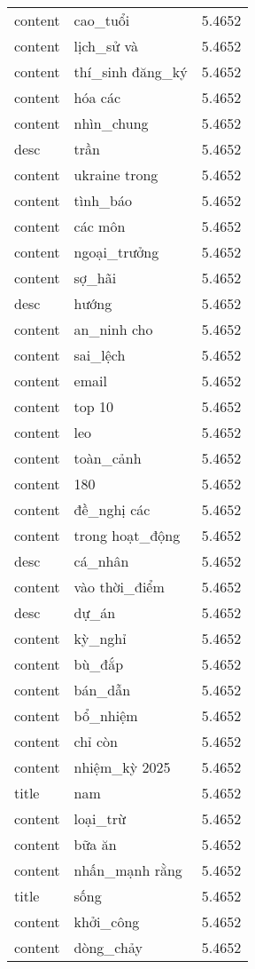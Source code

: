 \documentclass{article}
\begin{document}
\begin{tabular}{lll}
content & cao\_tuổi & 5.4652\\
content & lịch\_sử và & 5.4652\\
content & thí\_sinh đăng\_ký & 5.4652\\
content & hóa các & 5.4652\\
content & nhìn\_chung & 5.4652\\
desc & trần & 5.4652\\
content & ukraine trong & 5.4652\\
content & tình\_báo & 5.4652\\
content & các môn & 5.4652\\
content & ngoại\_trưởng & 5.4652\\
content & sợ\_hãi & 5.4652\\
desc & hướng & 5.4652\\
content & an\_ninh cho & 5.4652\\
content & sai\_lệch & 5.4652\\
content & email & 5.4652\\
content & top 10 & 5.4652\\
content & leo & 5.4652\\
content & toàn\_cảnh & 5.4652\\
content & 180 & 5.4652\\
content & đề\_nghị các & 5.4652\\
content & trong hoạt\_động & 5.4652\\
desc & cá\_nhân & 5.4652\\
content & vào thời\_điểm & 5.4652\\
desc & dự\_án & 5.4652\\
content & kỳ\_nghỉ & 5.4652\\
content & bù\_đắp & 5.4652\\
content & bán\_dẫn & 5.4652\\
content & bổ\_nhiệm & 5.4652\\
content & chỉ còn & 5.4652\\
content & nhiệm\_kỳ 2025 & 5.4652\\
title & nam & 5.4652\\
content & loại\_trừ & 5.4652\\
content & bữa ăn & 5.4652\\
content & nhấn\_mạnh rằng & 5.4652\\
title & sống & 5.4652\\
content & khởi\_công & 5.4652\\
content & dòng\_chảy & 5.4652\\

\end{tabular}
\end{document}
